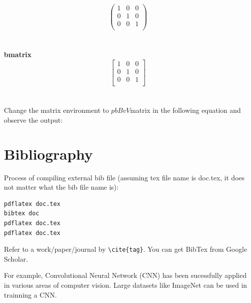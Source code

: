 \documentclass{article}
\begin{document}
\begin{equation}
	\begin{pmatrix}
		1 & 0 & 0\\
		0 & 1 & 0\\
		0 & 0 & 1\\
	\end{pmatrix}
\end{equation}
\\~\\
\textbf{bmatrix}
\begin{equation}
	\begin{bmatrix}
		1 & 0 & 0\\
		0 & 1 & 0\\
		0 & 0 & 1\\
	\end{bmatrix}
\end{equation}
\\~\\
Change the matrix environment to $pbBvV$matrix in the following equation and observe the output:


\section{Bibliography}

Process of compiling external bib file (assuming tex file name is doc.tex, it does not matter what the bib file name is):
\begin{verbatim}
pdflatex doc.tex
bibtex doc
pdflatex doc.tex
pdflatex doc.tex
\end{verbatim}

Refer to a work/paper/journal by \verb|\cite{tag}|. You can get BibTex from Google Scholar.

For example, Convolutional Neural Network (CNN) \cite{lecun1998gradient} has been sucessfully applied in various areas of computer vision. Large datasets like ImageNet \cite{deng2009imagenet} can be used in trainning a CNN.



\end{document}
